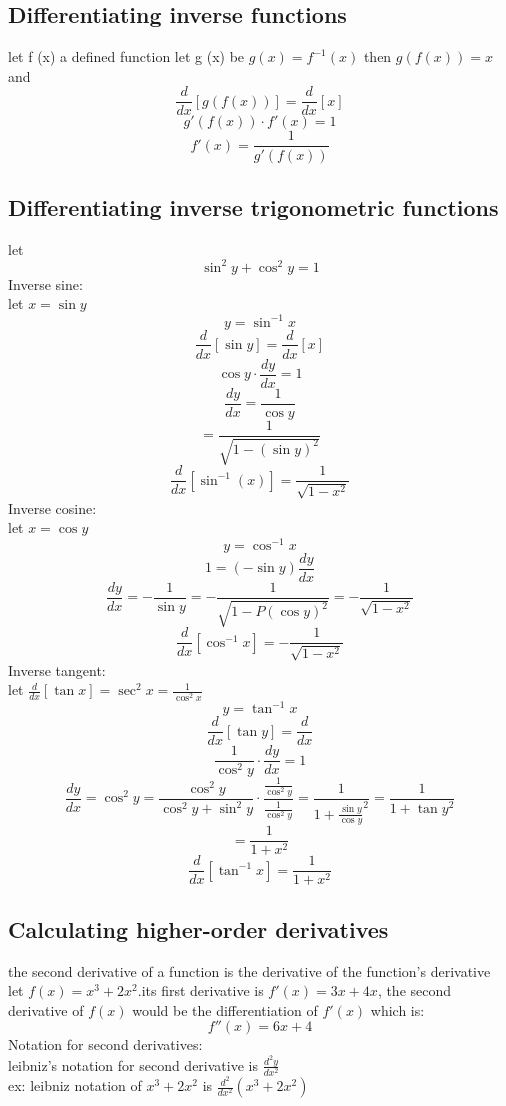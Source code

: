 \documentclass{article}
\begin{document}
        \subsection{Differentiating inverse functions}
            let f (x) a defined function \noindent
            let g (x) be \(g(x) = f^{-1}(x)\) then \(g(f(x)) = x\) and 
            \[\frac{d}{dx}[g(f(x))] = \frac{d}{dx}[x]\]
            \[g'(f(x)) \cdot f'(x) = 1\]
            \[f'(x) = \frac{1}{g'(f(x))}\]
        \subsection{Differentiating inverse trigonometric functions}
            let \[\sin^2 y + \cos^2 y = 1\]
            Inverse sine:\\
                let \(x = \sin y \)
                \[y = \sin^{-1} x\]
                \[\frac{d}{dx}[\sin y ] = \frac{d}{dx}[x]\]
                \[\cos y \cdot \frac{dy}{dx} = 1 \]
                \[\frac{dy}{dx} = \frac{1}{\cos y}\]
                \[= \frac{1}{\sqrt{1 - {(\sin y)}^2}}\]
                \[\frac{d}{dx}[\sin^{-1}(x)] = \frac{1}{\sqrt{1 - x^2}}\]
            Inverse cosine:\\ 
            let \(x = \cos y\) 
                \[y = \cos^{-1} x\]
                \[1 = (-\sin y)\frac{dy}{dx}\]
                \[\frac{dy}{dx} = - \frac{1}{\sin y} = -\frac{1}{\sqrt{1 - P{(\cos y)}^2}} = - \frac{1}{\sqrt{1 - x^2}}\]
                \[\frac{d}{dx}[\cos^{-1} x] = -\frac{1}{\sqrt{1 - x^2}}\]
            Inverse tangent:\\
            let \(\frac{d}{dx}[\tan x] = \sec^{2} x = \frac{1}{\cos^2 x}\)
                \[y = \tan^{-1} x\]
                \[\frac{d}{dx}[\tan y] = \frac{d}{dx}\]
                \[\frac{1}{\cos^{2} y} \cdot \frac{dy}{dx} = 1\]
                \[\frac{dy}{dx} = \cos^{2} y = \frac{\cos^{2} y}{\cos^{2} y + \sin^{2} y} \cdot \frac{\frac{1}{\cos^{2} y}}{\frac{1}{\cos^{2} y }} = \frac{1}{1 + {\frac{\sin y}{\cos y}}^2} = \frac{1}{1 + {\tan y}^2}\]
                \[ = \frac{1}{ 1 + x^2}\]
                \[\frac{d}{dx}[\tan^{-1} x ] = \frac{1}{ 1 + x^2}\]
        \subsection{Calculating higher-order derivatives}
            the second derivative of a function is the derivative of the function's derivative \\
            let \(f(x) = x^3 + 2x^2\).its first derivative is \(f'(x) = 3x + 4x\), the second derivative of \(f(x)\) would be the differentiation of \(f'(x)\) which is:
            \[f''(x) = 6x + 4\]
            Notation for second derivatives: \\
            leibniz's notation for second derivative is \(\frac{d^2y}{dx^2}\) \\ 
            ex: leibniz notation of \(x^3 + 2x^2\) is \(\frac{d^2}{dx^2}(x^3 + 2x^2)\)
\end{document}
